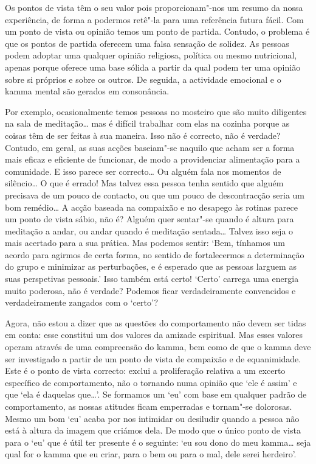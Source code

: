 Os pontos de vista têm o seu valor pois proporcionam"-nos um resumo da nossa
experiência, de forma a podermos retê"-la para uma referência futura fácil. Com
um ponto de vista ou opinião temos um ponto de partida. Contudo, o problema é
que os pontos de partida oferecem uma falsa sensação de solidez. As pessoas
podem adoptar uma qualquer opinião religiosa, política ou mesmo nutricional,
apenas porque oferece uma base sólida a partir da qual podem ter uma opinião
sobre si próprios e sobre os outros. De seguida, a actividade emocional e o
kamma mental são gerados em consonância.

Por exemplo, ocasionalmente temos pessoas no mosteiro que são muito diligentes
na sala de meditação\ldots{} mas é difícil trabalhar com elas na cozinha porque
as coisas têm de ser feitas à sua maneira. Isso não é correcto, não é verdade?
Contudo, em geral, as suas acções baseiam"-se naquilo que acham ser a forma mais
eficaz e eficiente de funcionar, de modo a providenciar alimentação para a
comunidade. E isso parece ser correcto\ldots{} Ou alguém fala nos momentos de
silêncio\ldots{} O que é errado! Mas talvez essa pessoa tenha sentido que alguém
precisava de um pouco de contacto, ou que um pouco de descontracção seria um bom
remédio\ldots{} A acção baseada na compaixão e no desapego às rotinas parece um
ponto de vista sábio, não é? Alguém quer sentar"-se quando é altura para
meditação a andar, ou andar quando é meditação sentada\ldots{} Talvez isso seja
o mais acertado para a sua prática. Mas podemos sentir: `Bem, tínhamos um acordo
para agirmos de certa forma, no sentido de fortalecermos a determinação do grupo
e minimizar as perturbações, e é esperado que as pessoas larguem as suas
perspetivas pessoais.' Isso também está certo! `Certo' carrega uma energia muito
poderosa, não é verdade? Podemos ficar verdadeiramente convencidos e
verdadeiramente zangados com o `certo'?

Agora, não estou a dizer que as questões do comportamento não devem ser tidas em
conta: esse constitui um dos valores da amizade espiritual. Mas esses valores
operam através de uma compreensão do kamma, bem como de que o kamma deve ser
investigado a partir de um ponto de vista de compaixão e de equanimidade. Este é
o ponto de vista correcto: exclui a proliferação relativa a um excerto
específico de comportamento, não o tornando numa opinião que `ele é assim' e que
`ela é daquelas que\ldots{}'. Se formamos um `eu' com base em qualquer padrão de
comportamento, as nossas atitudes ficam emperradas e tornam"-se dolorosas. Mesmo
um bom `eu' acaba por nos intimidar ou desiludir quando a pessoa não está à
altura da imagem que criámos dela. De modo que o único ponto de vista para o
`eu' que é útil ter presente é o seguinte: `eu sou dono do meu kamma\ldots{}
seja qual for o kamma que eu criar, para o bem ou para o mal, dele serei
herdeiro'.

